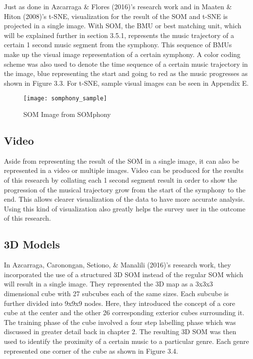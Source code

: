 Just as done in Azcarraga \& Flores (2016)'s research work and in Maaten \& Hiton (2008)'s t-SNE, visualization for the result of the SOM and t-SNE is projected in a single image. With SOM, the BMU or best matching unit, which will be explained further in section 3.5.1, represents the music trajectory of a certain 1 second music segment from the symphony. This sequence of BMUs make up the visual image representation of a certain symphony. A color coding scheme was also used to denote the time sequence of a certain music trajectory in the image, blue representing the start and going to red as the music progresses as shown in Figure 3.3. For t-SNE, sample visual images can be seen in Appendix E.

\begin{figure}[h]
\caption{SOM Image from SOMphony}
\centering
\texttt{[image: somphony\_sample]}
\end{figure}

\subsection{Video}
Aside from representing the result of the SOM in a single image, it can also be represented in a video or multiple images. Video can be produced for the results of this research by collating  each 1 second segment result in order to show the progression of the musical trajectory grow from the start of the symphony to the end. This allows clearer visualization of the data to have more accurate analysis. Using this kind of visualization also greatly helps the survey user in the outcome of this research.

\subsection{3D Models}

In Azcarraga, Caronongan,  Setiono, \& Manalili (2016)’s research work, they incorporated the use of a structured 3D SOM instead of the regular SOM which will result in a single image. They represented the 3D map as a 3x3x3 dimensional cube with 27 subcubes each of the same sizes. Each subcube is further divided into 9x9x9 nodes. Here, they introduced the concept of a core cube at the center and the other 26 corresponding exterior cubes surrounding it. The training phase of the cube involved a four step labelling phase which was discussed in greater detail back in chapter 2. The resulting 3D SOM was then used to identify the proximity of a certain music to a particular genre. Each genre represented one corner of the cube as shown in Figure 3.4.

